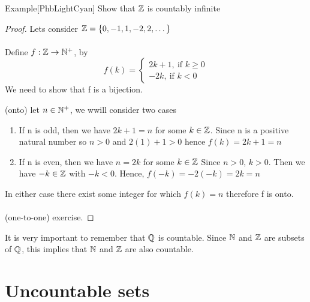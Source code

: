 \documentclass[../MATH-2000-Notes.tex]{subfiles}
\begin{document}
\begin{commentbox}{Example}[{PhbLightCyan}]
    Show that \(\mathbb{Z}\) is countably infinite
\end{commentbox}
\begin{proof}
    Lets consider \(\mathbb{Z} = \{0,-1,1,-2,2,\dots\}\)
    \\~\\
    Define \(f: \mathbb{Z} \to \mathbb{N}^+\), by
    \[f(k) = \begin{cases}
            2k+1,\ \text{if $k \geq 0$} \\
            -2k,\ \text{if $k < 0$}
        \end{cases}\]
    We need to show that f is a bijection.

    (onto) let \(n\in \mathbb{N}^+\), we wwill consider two cases
    \begin{enumerate}
        \item If n is odd, then we have \(2k + 1 = n\) for some \(k \in \mathbb{Z}\). Since n is a positive natural number so \(n > 0\) and \(2(1) + 1 > 0\) hence \(f(k) = 2k + 1 = n\)
        \item If n is even, then we have \(n = 2k\) for some \(k \in \mathbb{Z}\) Since \(n >0\), \(k > 0\). Then we have \(-k \in \mathbb{Z} \) with \(-k < 0\). Hence, \(f(-k) = -2(-k) = 2k = n\)
    \end{enumerate}
    In either case there exist some integer for which \(f(k) = n\) therefore f is onto.
    \\~\\
    (one-to-one) exercise.
\end{proof}

\begin{Note}
    It is very important to remember that \(\mathbb{Q}\) is countable. Since \(\mathbb{N}\) and \(\mathbb{Z}\) are subsets of \(\mathbb{Q}\), this implies that \(\mathbb{N} \) and \(\mathbb{Z} \) are also countable.
\end{Note}

\section{Uncountable sets}
\end{document}
